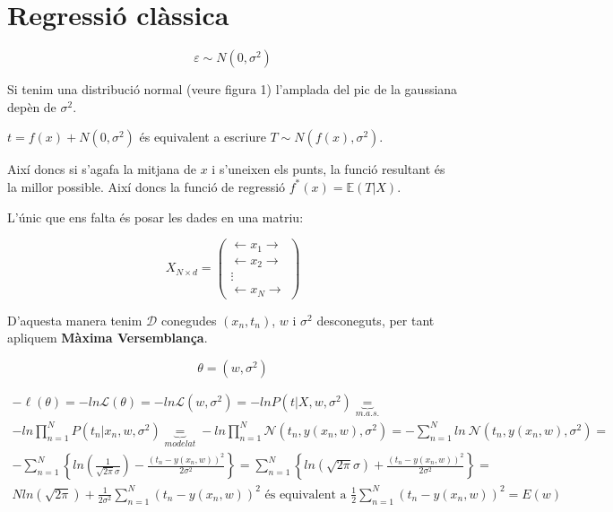 \documentclass[a4paper]{article}
\begin{document}
\section{Regressió clàssica}

$$
\varepsilon \sim N(0, \sigma^2)
$$

Si tenim una distribució normal (veure figura 1) l'amplada del pic de la gaussiana depèn de $\sigma^2$.

\begin{figure}[H]
    \centering
\end{figure}

$ t = f(x) + N(0, \sigma^2) $ és equivalent a escriure $T \sim N(f(x), \sigma^2) $.

Així doncs si s'agafa la mitjana de $x$ i s'uneixen els punts, la funció resultant és la millor possible. Així doncs la funció de regressió $f^*(x) = \mathbb{E}(T|X)$.

L'únic que ens falta és posar les dades en una matriu:

$$
X_{N \times d} =
\begin{pmatrix}
\longleftarrow x_1 \longrightarrow \\
\longleftarrow x_2 \longrightarrow \\
\vdots \\
\longleftarrow x_N \longrightarrow
\end{pmatrix}
$$

D'aquesta manera tenim $\mathcal{D}$ conegudes $(x_n, t_n)$, $w$ i $\sigma^2$ desconeguts, per tant apliquem \textbf{Màxima Versemblança}.

$$
\theta = (w, \sigma^2)
$$

\begin{gather*}
-\ell (\theta) = -ln \mathcal{L} (\theta) = 
-ln \mathcal{L}(w, \sigma^2) =
-ln P(t | X, w, \sigma^2) \underbrace{=}_{m.a.s.} \\
-ln \prod_{n=1}^N P(t_n | x_n, w, \sigma^2) \underbrace{=}_{modelat}
-ln \prod_{n=1}^N \mathcal{N} (t_n, y(x_n, w), \sigma^2) =
- \sum_{n=1}^N ln \ \mathcal{N} (t_n, y(x_n, w), \sigma^2) = \\
- \sum_{n=1}^N \left\{ ln \left( \frac{1}{\sqrt{2\pi}\sigma} \right) - \frac{(t_n - y(x_n, w))^2}{2\sigma^2} \right\} = 
\sum_{n=1}^N \left\{ ln(\sqrt{2\pi}\sigma) + \frac{(t_n - y(x_n, w))^2}{2\sigma^2} \right\} = \\
N ln (\sqrt{2\pi}) + \frac{1}{2\sigma^2} \sum_{n=1}^N (t_n - y(x_n,w))^2 \text{ és equivalent a } \frac{1}{2} \sum_{n=1}^N (t_n - y(x_n, w))^2 = E(w)
\end{gather*}
\end{document}
